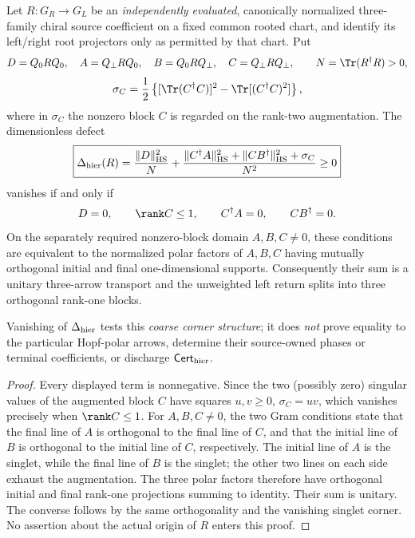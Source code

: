 \documentclass[12pt,a4paper]{article}
\begin{document}
\begin{theorem}
\label{p5:thm:v3211-hierarchy-corner-defect}
Let \(R:G_R\to G_L\) be an \emph{independently evaluated}, canonically
normalized three-family chiral source coefficient on a fixed common rooted
chart, and identify its left/right root projectors only as permitted by that
chart.  Put
\[
 D=Q_0RQ_0,\quad A=Q_\perp RQ_0,\quad
 B=Q_0RQ_\perp,\quad C=Q_\perp RQ_\perp,
 \qquad N=\Tr(R^\dagger R)>0,
\]
\[
 \sigma_C=\frac12\left\{
  [\Tr(C^\dagger C)]^2-\Tr[(C^\dagger C)^2]\right\},
\]
where in \(\sigma_C\) the nonzero block \(C\) is regarded on the
rank-two augmentation.  The dimensionless defect
\[
 \boxed{\Delta_{\rm hier}(R)=
   \frac{\|D\|_{\rm HS}^2}{N}
  +\frac{\|C^\dagger A\|_{\rm HS}^2+
          \|CB^\dagger\|_{\rm HS}^2+\sigma_C}{N^2}\ge0}
\]
vanishes if and only if
\[
 D=0,\qquad \rank C\le1,\qquad
 C^\dagger A=0,\qquad CB^\dagger=0.
\]
On the separately required nonzero-block domain \(A,B,C\ne0\), these
conditions are equivalent to the normalized polar factors of \(A,B,C\)
having mutually orthogonal initial and final one-dimensional supports.
Consequently their sum is a unitary three-arrow transport and the
unweighted left return splits into three orthogonal rank-one blocks.

Vanishing of \(\Delta_{\rm hier}\) tests this \emph{coarse corner
structure}; it does \emph{not} prove equality to the particular
Hopf-polar arrows, determine their source-owned phases or terminal
coefficients, or discharge \(\mathsf{Cert}_{\rm hier}\).
\end{theorem}
\begin{proof}
Every displayed term is nonnegative.  Since the two (possibly zero) singular
values of the augmented block \(C\) have squares \(u,v\ge0\),
\(\sigma_C=uv\), which vanishes precisely when \(\rank C\le1\).
For \(A,B,C\ne0\), the two Gram conditions state that the final line
of \(A\) is orthogonal to the final line of \(C\), and that the initial
line of \(B\) is orthogonal to the initial line of \(C\), respectively.
The initial line of \(A\) is the singlet, while the final line of \(B\)
is the singlet; the other two lines on each side exhaust the augmentation.
The three polar factors therefore have orthogonal initial and final
rank-one projections summing to identity.  Their sum is unitary.  The
converse follows by the same orthogonality and the vanishing singlet
corner.  No assertion about the actual origin of \(R\) enters this proof.
\end{proof}
\end{document}
